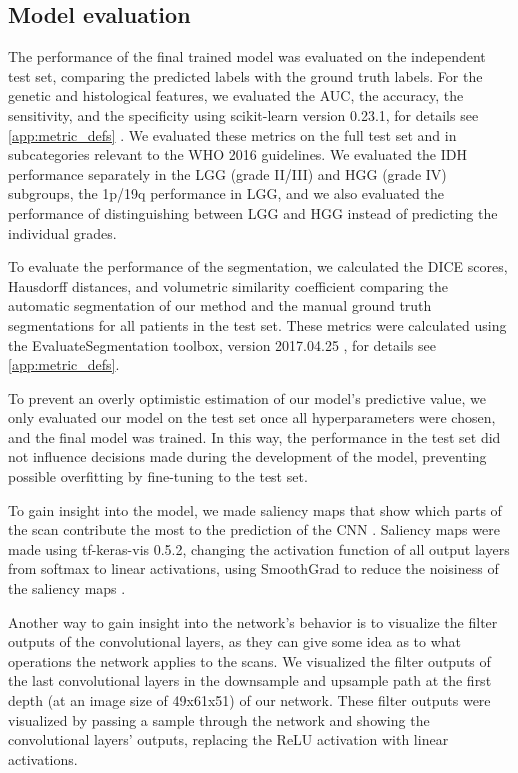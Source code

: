 \subsection{Model evaluation}

The performance of the final trained model was evaluated on the independent test set, comparing the predicted labels with the ground truth labels.
For the genetic and histological features, we evaluated the AUC, the accuracy, the sensitivity, and the specificity using scikit-learn version 0.23.1, for details see \cref{app:metric_defs} \autocite{pedregosa2011scikitlearn}.
We evaluated these metrics on the full test set and in subcategories relevant to the \gls{WHO} 2016 guidelines.
We evaluated the \gls{IDH} performance separately in the \gls{LGG} (grade II/III) and \gls{HGG} (grade IV) subgroups, the 1p/19q performance in \gls{LGG}, and we also evaluated the performance of distinguishing between \gls{LGG} and \gls{HGG} instead of predicting the individual grades.

To evaluate the performance of the segmentation, we calculated the DICE scores, Hausdorff distances, and volumetric similarity coefficient comparing the automatic segmentation of our method and the manual ground truth segmentations for all patients in the test set.
These metrics were calculated using the EvaluateSegmentation toolbox, version 2017.04.25 \autocite{taha2015metrics}, for details see \cref{app:metric_defs}.


To prevent an overly optimistic estimation of our model's predictive value, we only evaluated our model on the test set once all hyperparameters were chosen, and the final model was trained.
In this way, the performance in the test set did not influence decisions made during the development of the model, preventing possible overfitting by fine-tuning to the test set.

To gain insight into the model, we made saliency maps that show which parts of the scan contribute the most to the prediction of the \gls{CNN} \autocite{smilkov2017smoothgrad}.
Saliency maps were made using tf-keras-vis 0.5.2, changing the activation function of all output layers from softmax to linear activations, using SmoothGrad to reduce the noisiness of the saliency maps \autocite{smilkov2017smoothgrad}.

Another way to gain insight into the network's behavior is to visualize the filter outputs of the convolutional layers, as they can give some idea as to what operations the network applies to the scans.
We visualized the filter outputs of the last convolutional layers in the downsample and upsample path at the first depth (at an image size of 49x61x51) of our network.
These filter outputs were visualized by passing a sample through the network and showing the convolutional layers' outputs, replacing the ReLU activation with linear activations.

